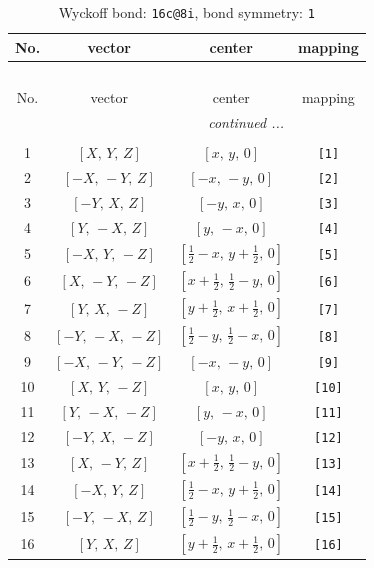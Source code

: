 \documentclass[fleqn,8pt]{jsarticle}
\begin{document}
\begin{longtable}{cccc}
\caption{Wyckoff bond: {\tt 16c@8i}, bond symmetry: {\tt 1}}
 \\
 \hline \hline
No. & vector & center & mapping \\ \hline \endfirsthead

\multicolumn{3}{l}{\tablename\ \thetable{}} \\
 \hline \hline
No. & vector & center & mapping \\ \hline \endhead

 \hline \hline
\multicolumn{3}{r}{\footnotesize\it continued ...} \\ \endfoot

 \hline \hline
\multicolumn{3}{r}{} \\ \endlastfoot

1 & $\left[ X,\, Y,\, Z \right]$ & $\left[ x,\, y,\, 0 \right]$ & {\tt [1]} \\ \hline
2 & $\left[ - X,\, - Y,\, Z \right]$ & $\left[ - x,\, - y,\, 0 \right]$ & {\tt [2]} \\ \hline
3 & $\left[ - Y,\, X,\, Z \right]$ & $\left[ - y,\, x,\, 0 \right]$ & {\tt [3]} \\ \hline
4 & $\left[ Y,\, - X,\, Z \right]$ & $\left[ y,\, - x,\, 0 \right]$ & {\tt [4]} \\ \hline
5 & $\left[ - X,\, Y,\, - Z \right]$ & $\left[ \frac{1}{2} - x,\, y + \frac{1}{2},\, 0 \right]$ & {\tt [5]} \\ \hline
6 & $\left[ X,\, - Y,\, - Z \right]$ & $\left[ x + \frac{1}{2},\, \frac{1}{2} - y,\, 0 \right]$ & {\tt [6]} \\ \hline
7 & $\left[ Y,\, X,\, - Z \right]$ & $\left[ y + \frac{1}{2},\, x + \frac{1}{2},\, 0 \right]$ & {\tt [7]} \\ \hline
8 & $\left[ - Y,\, - X,\, - Z \right]$ & $\left[ \frac{1}{2} - y,\, \frac{1}{2} - x,\, 0 \right]$ & {\tt [8]} \\ \hline
9 & $\left[ - X,\, - Y,\, - Z \right]$ & $\left[ - x,\, - y,\, 0 \right]$ & {\tt [9]} \\ \hline
10 & $\left[ X,\, Y,\, - Z \right]$ & $\left[ x,\, y,\, 0 \right]$ & {\tt [10]} \\ \hline
11 & $\left[ Y,\, - X,\, - Z \right]$ & $\left[ y,\, - x,\, 0 \right]$ & {\tt [11]} \\ \hline
12 & $\left[ - Y,\, X,\, - Z \right]$ & $\left[ - y,\, x,\, 0 \right]$ & {\tt [12]} \\ \hline
13 & $\left[ X,\, - Y,\, Z \right]$ & $\left[ x + \frac{1}{2},\, \frac{1}{2} - y,\, 0 \right]$ & {\tt [13]} \\ \hline
14 & $\left[ - X,\, Y,\, Z \right]$ & $\left[ \frac{1}{2} - x,\, y + \frac{1}{2},\, 0 \right]$ & {\tt [14]} \\ \hline
15 & $\left[ - Y,\, - X,\, Z \right]$ & $\left[ \frac{1}{2} - y,\, \frac{1}{2} - x,\, 0 \right]$ & {\tt [15]} \\ \hline
16 & $\left[ Y,\, X,\, Z \right]$ & $\left[ y + \frac{1}{2},\, x + \frac{1}{2},\, 0 \right]$ & {\tt [16]} \\
\end{longtable}
\end{document}
